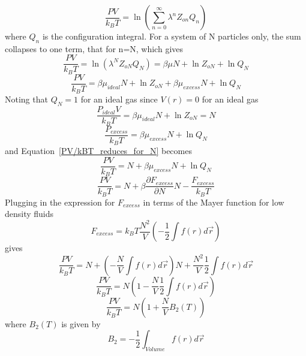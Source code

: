 \documentclass[double,12pt]{beavtex}
\begin{document}
\begin{equation}\frac{PV}{k_BT}=\ln{\left(\sum_{n=0}^\infty \lambda^nZ_{on}Q_n\right)} \end{equation}
where $Q_n$ is the configuration integral.
For a system of N particles only, the sum collapses to one term, 
that for n=N, which gives 
\begin{equation}\label{PV/kBT_reduces_for_N}\frac{PV}{k_BT}=\ln{\left(\lambda^NZ_{oN}Q_N\right)}
=\beta\mu{N} + \ln{Z}_{oN} +\ln{Q}_N\end{equation}
\begin{equation}\label{PV/kBT_reduces_for_N}\frac{PV}{k_BT}=\beta\mu_{ideal}{N} + \ln{Z}_{oN} + \beta\mu_{excess}{N} + \ln{Q}_N\end{equation}
Noting that $Q_N=1$ for an ideal gas since $V(r)=0$ for an ideal gas
\begin{equation}\frac{P_{ideal}V}{k_BT}=\beta\mu_{ideal}{N} + \ln{Z}_{oN}=N\end{equation}
\begin{equation}\frac{P_{excess}}{k_BT}= \beta\mu_{excess}{N} + \ln{Q}_N\end{equation}
and Equation~\ref{PV/kBT_reduces_for_N} becomes
\begin{equation}\frac{PV}{k_BT}=N + \beta\mu_{excess}{N} + \ln{Q}_N\end{equation}
\begin{equation}\frac{PV}{k_BT}=N + \beta\frac{\partial{F}_{excess}}{\partial{N}}{N} - \frac{F_{excess}}{k_BT}\end{equation}
Plugging in the expression for $F_{excess}$ in terms of the Mayer function 
for low density fluids
\begin{equation}F_{excess}=k_BT\frac{N^2}{V}\left(-\frac{1}{2}\int{f(r)d\vec{r}}\right)\end{equation}
gives
\begin{equation}\frac{PV}{k_BT}=N + \left(-\frac{N}{V}\int{f(r)d\vec{r}}\right){N} + \frac{N^2}{V}\frac{1}{2}\int{f(r)d\vec{r}}\end{equation}
\begin{equation}\frac{PV}{k_BT}=N\left(1-\frac{N}{V}\frac{1}{2}\int{f(r)d\vec{r}}\right)\end{equation}
\begin{equation}\frac{PV}{k_BT}=N\left(1+\frac{N}{V}B_2(T)\right) \end{equation}
where $B_2(T)$ is given by
\begin{equation}B_2=-\frac{1}{2}\int_{Volume}f(r)d\vec{r} \end{equation}
\end{document}
